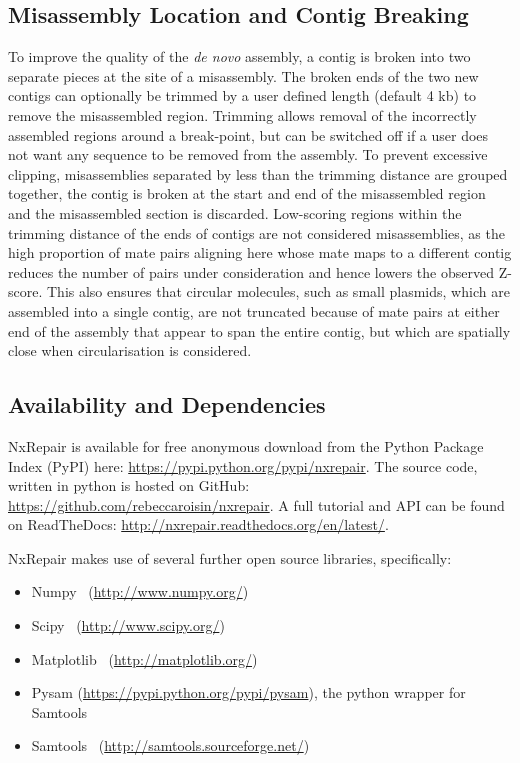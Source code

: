 \documentclass[fleqn,10pt]{wlpeerj}
\begin{document}
\subsection*{Misassembly Location and Contig Breaking}
To improve the quality of the \textit{de novo} assembly, a contig is broken into two separate pieces at the site of a misassembly. The broken ends of the two new contigs can optionally be trimmed by a user defined length (default 4 kb) to remove the misassembled region. Trimming allows removal of the incorrectly assembled regions around a break-point, but can be switched off if a user does not want any sequence to be removed from the assembly. To prevent excessive clipping, misassemblies separated by less than the trimming distance are grouped together, the contig is broken at the start and end of the misassembled region and the misassembled section is discarded. Low-scoring regions within the trimming distance of the ends of contigs are not considered misassemblies, as the high proportion of mate pairs aligning here whose mate maps to a different contig reduces the number of pairs under consideration and hence lowers the observed Z-score. This also ensures that circular molecules, such as small plasmids, which are assembled into a single contig, are not truncated because of mate pairs at either end of the assembly that appear to span the entire contig, but which are spatially close when circularisation is considered.

\subsection*{Availability and Dependencies}
NxRepair is available for free anonymous download from the Python Package Index (PyPI) here: \url{https://pypi.python.org/pypi/nxrepair}.
The source code, written in python is hosted on GitHub: \url{https://github.com/rebeccaroisin/nxrepair}.
A full tutorial and API can be found on ReadTheDocs: \url{http://nxrepair.readthedocs.org/en/latest/}.

NxRepair makes use of several further open source libraries, specifically:

\begin{itemize}
\item[] Numpy~\citep{numpy} (\url{http://www.numpy.org/})
\item[] Scipy~\citep{scipy} (\url{http://www.scipy.org/})
\item[] Matplotlib~\citep{Hunter2007} (\url{http://matplotlib.org/})
\item[] Pysam (\url{https://pypi.python.org/pypi/pysam}), the python wrapper for Samtools
\item[] Samtools~\citep{li2009} (\url{http://samtools.sourceforge.net/})
\end{itemize}
\end{document}
